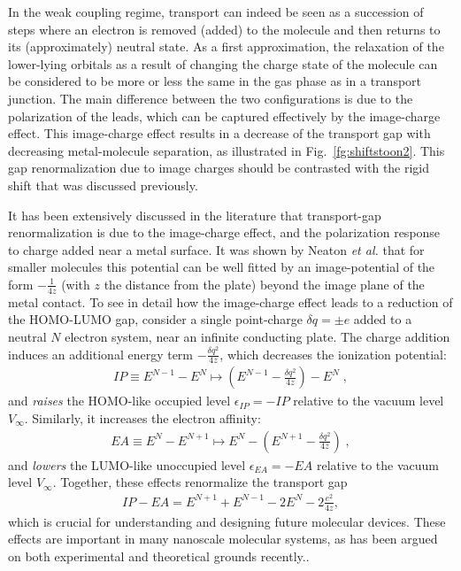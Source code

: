\documentclass[aip,jcp,a4paper,reprint,floatfix,superscriptaddress]{revtex4-1}
\newcommand{\etal}{\emph{et al.}\xspace}
\begin{document}
In the weak coupling regime, transport can indeed be seen as a succession of steps where an electron is removed (added) to the molecule and then returns to its (approximately) neutral state. As a first approximation, the relaxation of the lower-lying orbitals as a result of changing the charge state of the molecule can be considered to be more or less the same in the gas phase as in a transport junction. The main difference between the two configurations is due to the polarization of the leads, which can be captured effectively by the image-charge effect. This image-charge effect results in a decrease of the transport gap  with decreasing metal-molecule separation, as illustrated in Fig.~\ref{fg:shiftstoon2}. This gap renormalization due to image charges should be contrasted with the rigid shift that was discussed previously. 

It has been extensively discussed in the literature that transport-gap renormalization is due to the image-charge effect,\cite{Quek2007,Neaton2006,Hybertsen1986,Hybertsen2008,Thygesen2009} and the 
polarization response to charge added near a metal surface. It was shown by Neaton \etal\cite{Neaton2006} that for smaller molecules this potential can be well fitted by an image-potential of the form $-\frac{1}{4z}$ (with $z$ the distance from the plate) beyond the image plane of the metal contact. 
To see in detail how the image-charge effect leads to a reduction of the HOMO-LUMO gap, consider a single point-charge $\delta q=\pm e$ added to a neutral $N$ electron system, near an infinite conducting plate. The charge addition induces an additional energy term $-\frac{\delta q^2}{4z}$, which decreases the ionization potential:
\begin{align}
   \label{eq:HOMO}
   IP\equiv E^{N-1}-E^N \mapsto (E^{N-1}- \frac{\delta q^2}{4z}) - E^N\;,
\end{align}
and \emph{raises} the HOMO-like occupied level $\epsilon_{IP}=-IP$ relative to the vacuum level $V_\infty$. Similarly, it increases the electron affinity:
\begin{align}
   \label{eq:LUMO}
   EA \equiv E^{N}-E^{N+1} \mapsto E^{N} -(E^{N+1}- \frac{\delta q^2}{4z})\;,
\end{align}
and \emph{lowers} the LUMO-like unoccupied level $\epsilon_{EA}=-EA$ relative to the vacuum level $V_\infty$. Together, these effects renormalize the transport gap 
\begin{align}
   \label{eq:GAP-RENORMA}
IP-EA = E^{N+1} + E^{N-1} - 2E^{N} -2\frac{e^2}{4z},
\end{align}
which is crucial for understanding and designing future molecular devices. These effects are important in many nanoscale molecular systems, as has been argued on both experimental\cite{Kubatkin2003,Hedegaard2005,Bruot2012} and theoretical grounds recently.\cite{Neaton2006,Quek2007,Mowbray2008,Kaasbjerg2008,Hybertsen2008,Thygesen2009}.
\end{document}

